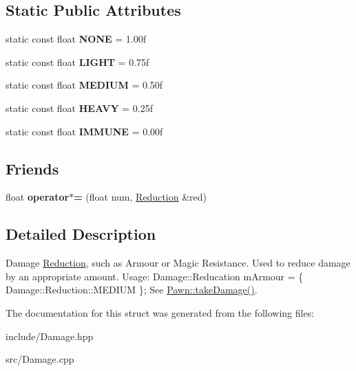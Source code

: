 \subsection*{Static Public Attributes}
\begin{DoxyCompactItemize}
\item 
\hypertarget{struct_damage_1_1_reduction_a867817a46ed62ac5b7b8b8ba7120a58a}{}static const float {\bfseries N\+O\+N\+E} = 1.\+00f\label{struct_damage_1_1_reduction_a867817a46ed62ac5b7b8b8ba7120a58a}

\item 
\hypertarget{struct_damage_1_1_reduction_ada67febdc8d5baf3978ea46fbce888fd}{}static const float {\bfseries L\+I\+G\+H\+T} = 0.\+75f\label{struct_damage_1_1_reduction_ada67febdc8d5baf3978ea46fbce888fd}

\item 
\hypertarget{struct_damage_1_1_reduction_a73158dcb1bf2809e82ea95ae9cca9918}{}static const float {\bfseries M\+E\+D\+I\+U\+M} = 0.\+50f\label{struct_damage_1_1_reduction_a73158dcb1bf2809e82ea95ae9cca9918}

\item 
\hypertarget{struct_damage_1_1_reduction_a088066d69d2c5db850fe37b216032b72}{}static const float {\bfseries H\+E\+A\+V\+Y} = 0.\+25f\label{struct_damage_1_1_reduction_a088066d69d2c5db850fe37b216032b72}

\item 
\hypertarget{struct_damage_1_1_reduction_abb2be906422a50ab4ad73e02661c272a}{}static const float {\bfseries I\+M\+M\+U\+N\+E} = 0.\+00f\label{struct_damage_1_1_reduction_abb2be906422a50ab4ad73e02661c272a}

\end{DoxyCompactItemize}
\subsection*{Friends}
\begin{DoxyCompactItemize}
\item 
\hypertarget{struct_damage_1_1_reduction_a1e5e8114fb59580f69b199798cc597c8}{}float {\bfseries operator$\ast$=} (float num, \hyperlink{struct_damage_1_1_reduction}{Reduction} \&red)\label{struct_damage_1_1_reduction_a1e5e8114fb59580f69b199798cc597c8}

\end{DoxyCompactItemize}


\subsection{Detailed Description}
Damage \hyperlink{struct_damage_1_1_reduction}{Reduction}, such as Armour or Magic Resistance. Used to reduce damage by an appropriate amount. Usage\+: Damage\+::\+Reducation m\+Armour = \{ Damage\+::\+Reduction\+::\+M\+E\+D\+I\+U\+M \}; See \hyperlink{class_pawn_a33dbdacc56d2f0728d7485b508b6d28e}{Pawn\+::take\+Damage()}. 

The documentation for this struct was generated from the following files\+:\begin{DoxyCompactItemize}
\item 
include/Damage.\+hpp\item 
src/Damage.\+cpp\end{DoxyCompactItemize}
